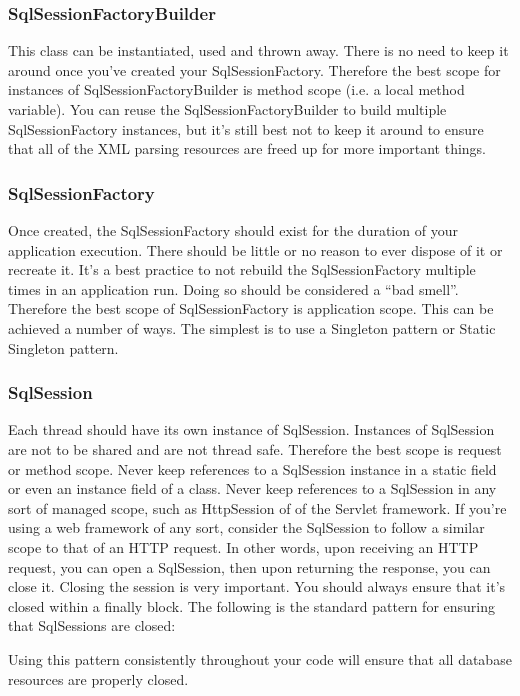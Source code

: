 \subsubsection{SqlSessionFactoryBuilder}
This class can be instantiated, used and thrown away. There is no need to keep it around once you've created your SqlSessionFactory. Therefore the best scope for instances of SqlSessionFactoryBuilder is method scope (i.e. a local method variable). You can reuse the SqlSessionFactoryBuilder to build multiple SqlSessionFactory instances, but it's still best not to keep it around to ensure that all of the XML parsing resources are freed up for more important things.
\subsubsection{SqlSessionFactory}
Once created, the SqlSessionFactory should exist for the duration of your application execution. There should be little or no reason to ever dispose of it or recreate it. It's a best practice to not rebuild the SqlSessionFactory multiple times in an application run. Doing so should be considered a “bad smell”. Therefore the best scope of SqlSessionFactory is application scope. This can be achieved a number of ways. The simplest is to use a Singleton pattern or Static Singleton pattern.
\subsubsection{SqlSession}
Each thread should have its own instance of SqlSession. Instances of SqlSession are not to be shared and are not thread safe. Therefore the best scope is request or method scope. Never keep references to a SqlSession instance in a static field or even an instance field of a class. Never keep references to a SqlSession in any sort of managed scope, such as HttpSession of of the Servlet framework. If you're using a web framework of any sort, consider the SqlSession to follow a similar scope to that of an HTTP request. In other words, upon receiving an HTTP request, you can open a SqlSession, then upon returning the response, you can close it. Closing the session is very important. You should always ensure that it's closed within a finally block. The following is the standard pattern for ensuring that SqlSessions are closed:



Using this pattern consistently throughout your code will ensure that all database resources are properly closed.
